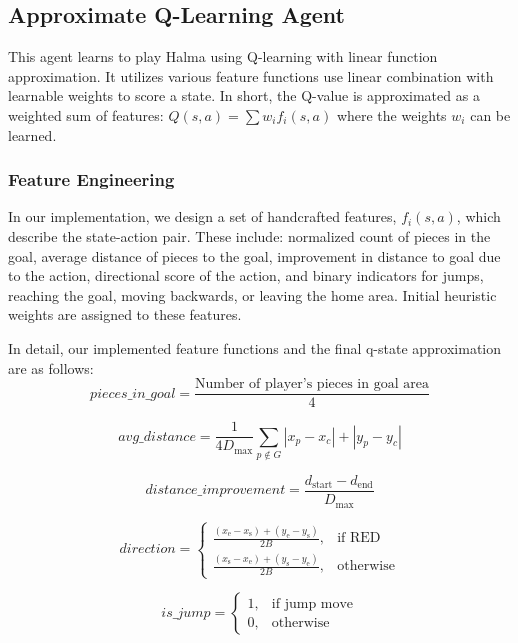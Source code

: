 \subsection{Approximate Q-Learning Agent}
This agent learns to play Halma using Q-learning with linear function approximation. It utilizes various feature functions use linear combination with learnable weights to score a state. In short, the Q-value is approximated as a weighted sum of features: $Q(s,a) = \sum w_i f_i(s,a)$ where the weights $w_i$ can be learned.

\subsubsection{Feature Engineering}
In our implementation, we design a set of handcrafted features, $f_i(s,a)$, which describe the state-action pair. These include: normalized count of pieces in the goal, average distance of pieces to the goal, improvement in distance to goal due to the action, directional score of the action, and binary indicators for jumps, reaching the goal, moving backwards, or leaving the home area. Initial heuristic weights are assigned to these features.

In detail, our implemented feature functions and the final q-state approximation are as follows:
\begin{equation}
pieces\_in\_goal = \frac{\text{Number of player's pieces in goal area}}{4}
\end{equation}

\begin{equation}
avg\_distance = \frac{1}{4D_{\max}} \sum_{p \notin G} \left| x_p - x_c \right| + \left| y_p - y_c \right|
\end{equation}

\begin{equation}
distance\_improvement = \frac{d_{\text{start}} - d_{\text{end}}}{D_{\max}}
\end{equation}

\begin{equation}
direction = 
\begin{cases} 
\frac{(x_{\text{e}} - x_{\text{s}}) + (y_{\text{e}} - y_{\text{s}})}{2B}, & \text{if RED} \\
\frac{(x_{\text{s}} - x_{\text{e}}) + (y_{\text{s}} - y_{\text{e}})}{2B}, & \text{otherwise}
\end{cases}
\end{equation}

\begin{equation}
is\_jump = 
\begin{cases} 
1, & \text{if jump move} \\
0, & \text{otherwise}
\end{cases}
\end{equation}


